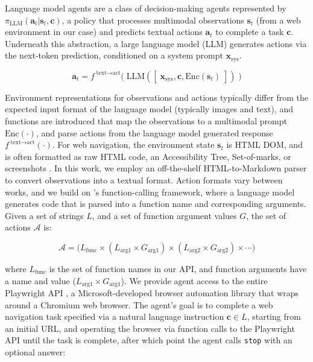 Language model agents are a class of decision-making agents represented by $\pi_{\text{LLM}} ( \mathbf{a}_{t} | \mathbf{s}_{t}, \mathbf{c} ) $, a policy that processes multimodal observations $\mathbf{s}_{t}$ (from a web environment in our case) and predicts textual actions $\mathbf{a}_{t}$ to complete a task $\mathbf{c}$. Underneath this abstraction, a large language model (LLM) generates actions via the next-token prediction, conditioned on a system prompt $\mathbf{x}_{\text{sys}}$.

\begin{equation}
    \mathbf{a}_{t} = f^{\;\text{text} \to \text{act}} \big( \; \text{LLM} ([ \; \mathbf{x}_{\text{sys}}, \mathbf{c},  
    \text{Enc} ( \mathbf{s}_{t} ) \; ]) \; \big)
\end{equation}

Environment representations for observations and actions typically differ from the expected input format of the language model (typically images and text), and functions are introduced that map the observations to a multimodal prompt $\text{Enc} ( \cdot )$, and parse actions from the language model generated response $f^{\;\text{text} \to \text{act}} ( \cdot )$. For web navigation, the environment state $\mathbf{s}_{t}$ is HTML DOM, and is often formatted as raw HTML code, an Accessibility Tree, Set-of-marks, or screenshots \citep{WebArena,VisualWebArena,BrowserGym,ScribeAgent}. In this work, we employ an off-the-shelf HTML-to-Markdown parser to convert observations into a textual format. Action formats vary between works, and we build on \citet{ToolFormer}'s function-calling framework, where a language model generates code that is parsed into a function name and corresponding arguments. Given a set of strings $L$, and a set of function argument values $G$, the set of actions $\mathcal{A}$ is:

\begin{equation}
    \mathcal{A} = \big( L_{\text{func}} \times ( L_{\text{arg1}} \times G_{\text{arg1}} ) \times ( L_{\text{arg2}} \times G_{\text{arg2}} ) \times \cdots \big)
\end{equation}

where $L_{\text{func}}$ is the set of function names in our API, and function arguments have a name and value ($L_{\text{arg1}} \times G_{\text{arg1}}$). We provide agent access to the entire Playwright API \citep{Playwright}, a Microsoft-developed browser automation library that wraps around a Chromium web browser. The agent's goal is to complete a web navigation task specified via a natural language instruction $\mathbf{c} \in L$, starting from an initial URL, and operating the browser via function calls to the Playwright API until the task is complete, after which point the agent calls \texttt{stop} with an optional answer:

